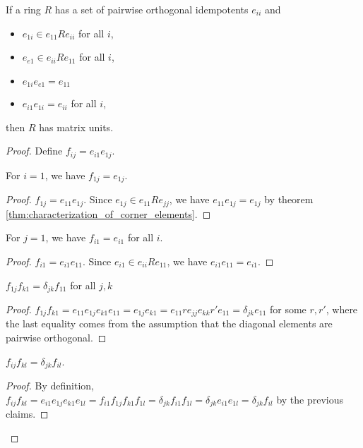   \begin{theorem}
    \label{thm:criterion_for_matrix_units}
    If a ring $R$ has a set of pairwise orthogonal idempotents $e_{ii}$ and
    \begin{itemize}
      \item $e_{1i} \in e_{11}Re_{ii}$ for all $i$,
      \item $e_{e1} \in e_{ii}Re_{11}$ for all $i$,
      \item $e_{1i}e_{e1} = e_{11}$ 
      \item $e_{i1}e_{1i} = e_{ii}$ for all $i$,
    \end{itemize}
    then $R$ has matrix units.
  \end{theorem}
  \begin{proof}
    Define $f_{ij} = e_{i1}e_{1j}$.

    \begin{claim}
      For $i = 1$, we have $f_{1j} = e_{1j}$.
    \end{claim}
    \begin{proof}
      $f_{1j} = e_{11}e_{1j}$. Since $e_{1j} \in e_{11}Re_{jj}$, we have $e_{11}e_{1j} = e_{1j}$ by theorem \ref{thm:characterization_of_corner_elements}.
    \end{proof}
    \begin{claim}
      For $j = 1$, we have $f_{i1} = e_{i1}$ for all $i$.
    \end{claim}
    \begin{proof}
      $f_{i1} = e_{i1}e_{11}$. Since $e_{i1} \in e_{ii}Re_{11}$, we have $e_{i1}e_{11} = e_{i1}$.
    \end{proof}
    \begin{claim}
      $f_{1j} f_{k1} = \delta_{jk} f_{11}$ for all $j, k$
    \end{claim}
    \begin{proof}
      $f_{1j} f_{k1} = e_{11}e_{1j}e_{k1}e_{11} = e_{1j}e_{k1} = e_{11} r e_{jj} e_{kk} r' e_{11} = \delta_{jk} e_{11}$ for some $r, r'$, where the last equality comes from the assumption that the diagonal elements are pairwise orthogonal.
    \end{proof}

    \begin{claim}
      $f_{ij} f_{kl} = \delta_{jk} f_{il}$.
    \end{claim}
    \begin{proof}
      By definition, $f_{ij} f_{kl} = e_{i1}e_{1j} e_{k1}e_{1l} = f_{i1}f_{1j} f_{k1}f_{1l} = \delta_{jk} f_{i1} f_{1l} = \delta_{jk} e_{i1} e_{1l} = \delta_{jk} f_{il}$ by the previous claims.
    \end{proof}
  \end{proof}


